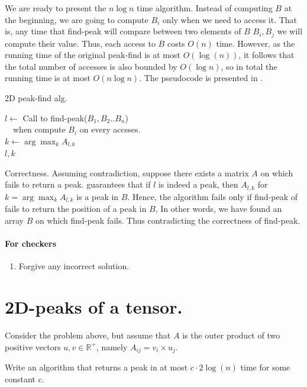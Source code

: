 We are ready to present the $n\log n$ time algorithm. Instead of computing $B$ at the beginning, we are going to compute $B_{i}$ only when we need to access it. That is, any time that find-peak will compare between two elements of $B$ $B_{i},B_{j}$ we will compute their value. Thus, each access to $B$ costs $O(n)$ time. However, as the running time of the original peak-find is at most $O(\log(n))$, it follows that the total number of accesses is also bounded by $O(\log n)$, so in total the running time is at most $O(n\log n)$. The pseudocode is presented in .
\begin{algorithm} 
\caption{2D peak-find alg.} \label{alg:2D}
$l \leftarrow $ Call to find-peak($B_{1}, B_{2} .. B_{n}$) \\ 
\ \ when compute $B_{i}$ on every accsses.  \\
$k \leftarrow \arg \max_{k}A_{l,k}$\\
\Return $l, k$  
\end{algorithm}

Correctness. Assuming contradiction, suppose there exists a matrix $A$ on which  fails to return a peak.  guarantees that if $l$ is indeed a peak, then $A_{l,k}$ for $k = \arg \max_{k}A_{l,k}$ is a peak in $B$. Hence, the algorithm fails only if find-peak of fails to return the position of a peak in $B$, In other words, we have found an array $B$ on which find-peak fails. Thus contradicting the correctness of find-peak.
\fi

\ifdefined\CHECK 
\paragraph{For checkers}
\begin{enumerate}
  \item Forgive any incorrect solution. 
\end{enumerate}
\fi


\ifdefined\DPEAK
\ifdefined\SOLUTION


\section{2D-peaks of a tensor.} Consider the problem above, but assume that $A$ is the outer product of two positive vectors $u,v \in \mathbb{R}^{+}$, namely $A_{ij} = v_i \times u_j$.

Write an algorithm that returns a peak in at most $c \cdot 2 \log(n)$ time for some constant $c$.


